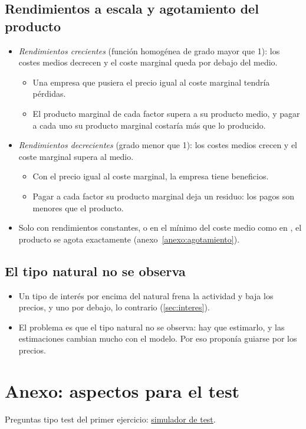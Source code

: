 \documentclass[11pt]{article}
\begin{document}
\subsection{Rendimientos a escala y agotamiento del producto}\label{anexo:rendimientos}

\begin{itemize}
\item \emph{Rendimientos crecientes} (función homogénea de grado mayor que 1): los costes medios decrecen y el coste marginal queda por debajo del medio.
  \begin{itemize}
  \item Una empresa que pusiera el precio igual al coste marginal tendría pérdidas.
  \item El producto marginal de cada factor supera a su producto medio, y pagar a cada uno su producto marginal costaría más que lo producido.
  \end{itemize}
\item \emph{Rendimientos decrecientes} (grado menor que 1): los costes medios crecen y el coste marginal supera al medio.
  \begin{itemize}
  \item Con el precio igual al coste marginal, la empresa tiene beneficios.
  \item Pagar a cada factor su producto marginal deja un residuo: los pagos son menores que el producto.
  \end{itemize}
\item Solo con rendimientos constantes, o en el mínimo del coste medio como en , el producto se agota exactamente (anexo~\ref{anexo:agotamiento}).
\end{itemize}

\subsection{El tipo natural no se observa}\label{anexo:tiponatural}

\begin{itemize}
\item Un tipo de interés por encima del natural frena la actividad y baja los precios, y uno por debajo, lo contrario (\ref{sec:interes}).
\item El problema es que el tipo natural no se observa: hay que estimarlo, y las estimaciones cambian mucho con el modelo\nocite{HolstonLaubachWilliams2017Measuring}. Por eso  proponía guiarse por los precios.
\end{itemize}

\section{Anexo: aspectos para el test}\label{anexo:test}

\begin{anotaciones}
Preguntas tipo test del primer ejercicio: \href{https://www.victorgutierrezmarcos.es/oposicion/temario/primer-ejercicio/test/simulador.html?tema=3.A.3}{simulador de test}.
\end{anotaciones}

\bibliografia
\end{document}
